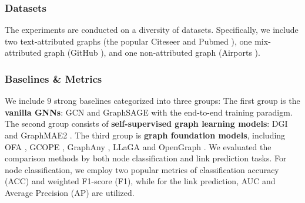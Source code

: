 \subsubsection{\textbf{Datasets}}
The experiments are conducted on a diversity of datasets. 
Specifically, we include two text-attributed graphs (the popular Citeseer and Pubmed \cite{citeseerandpubmed}),
one mix-attributed graph (GitHub \cite{github}),
and one non-attributed graph  (Airports \cite{kdd17struc2vec}).


\subsubsection{\textbf{Baselines \& Metrics}}
We include $9$ strong baselines categorized into three groups:
The first group is the \textbf{vanilla GNNs}: GCN \cite{iclr17gcn} and GraphSAGE \cite{nips17GraphSAGE} with the end-to-end training paradigm.
The second group consists of \textbf{self-supervised graph learning models}: DGI \cite{iclr19dgi} and GraphMAE2 \cite{www23graphmae2}. 
The third group is \textbf{graph foundation models}, including OFA \cite{iclr24ofa}, GCOPE \cite{kdd24gcope}, GraphAny \cite{zhao2024graphany}, LLaGA \cite{icml24llaga} and OpenGraph \cite{xia2024opengraph}. 
We evaluated the comparison methods by both node classification and link prediction tasks.
For node classification, we employ two popular metrics of classification accuracy (ACC) and weighted F1-score (F1), while for the link prediction,  AUC and Average Precision (AP) are utilized. 

